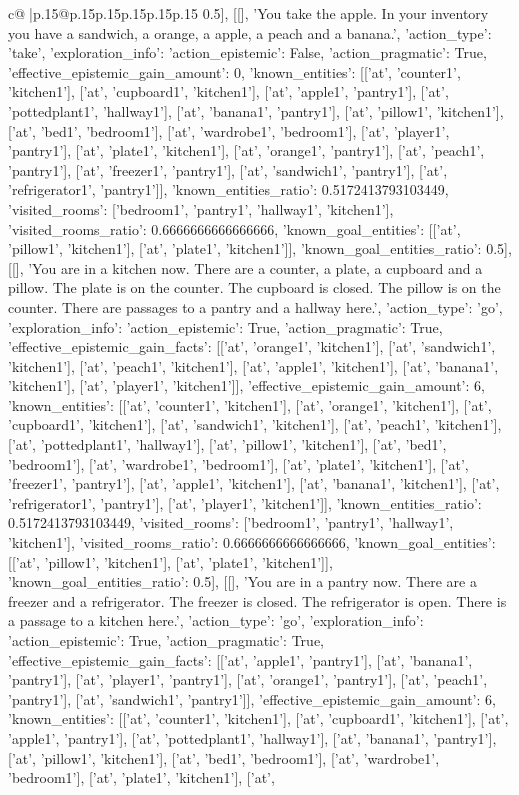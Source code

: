 \documentclass{article}
\begin{document}
{\begin{supertabular}{c@{$\;$}|p{.15\linewidth}@{}p{.15\linewidth}p{.15\linewidth}p{.15\linewidth}p{.15\linewidth}p{.15\linewidth}}
{{{0.5}}], [[], 'You take the apple. In your inventory you have a sandwich, a orange, a apple, a peach and a banana.\n', {'action_type': 'take', 'exploration_info': {'action_epistemic': False, 'action_pragmatic': True, 'effective_epistemic_gain_amount': 0, 'known_entities': [['at', 'counter1', 'kitchen1'], ['at', 'cupboard1', 'kitchen1'], ['at', 'apple1', 'pantry1'], ['at', 'pottedplant1', 'hallway1'], ['at', 'banana1', 'pantry1'], ['at', 'pillow1', 'kitchen1'], ['at', 'bed1', 'bedroom1'], ['at', 'wardrobe1', 'bedroom1'], ['at', 'player1', 'pantry1'], ['at', 'plate1', 'kitchen1'], ['at', 'orange1', 'pantry1'], ['at', 'peach1', 'pantry1'], ['at', 'freezer1', 'pantry1'], ['at', 'sandwich1', 'pantry1'], ['at', 'refrigerator1', 'pantry1']], 'known_entities_ratio': 0.5172413793103449, 'visited_rooms': ['bedroom1', 'pantry1', 'hallway1', 'kitchen1'], 'visited_rooms_ratio': 0.6666666666666666, 'known_goal_entities': [['at', 'pillow1', 'kitchen1'], ['at', 'plate1', 'kitchen1']], 'known_goal_entities_ratio': 0.5}}], [[], 'You are in a kitchen now. There are a counter, a plate, a cupboard and a pillow. The plate is on the counter. The cupboard is closed. The pillow is on the counter. There are passages to a pantry and a hallway here.\n', {'action_type': 'go', 'exploration_info': {'action_epistemic': True, 'action_pragmatic': True, 'effective_epistemic_gain_facts': [['at', 'orange1', 'kitchen1'], ['at', 'sandwich1', 'kitchen1'], ['at', 'peach1', 'kitchen1'], ['at', 'apple1', 'kitchen1'], ['at', 'banana1', 'kitchen1'], ['at', 'player1', 'kitchen1']], 'effective_epistemic_gain_amount': 6, 'known_entities': [['at', 'counter1', 'kitchen1'], ['at', 'orange1', 'kitchen1'], ['at', 'cupboard1', 'kitchen1'], ['at', 'sandwich1', 'kitchen1'], ['at', 'peach1', 'kitchen1'], ['at', 'pottedplant1', 'hallway1'], ['at', 'pillow1', 'kitchen1'], ['at', 'bed1', 'bedroom1'], ['at', 'wardrobe1', 'bedroom1'], ['at', 'plate1', 'kitchen1'], ['at', 'freezer1', 'pantry1'], ['at', 'apple1', 'kitchen1'], ['at', 'banana1', 'kitchen1'], ['at', 'refrigerator1', 'pantry1'], ['at', 'player1', 'kitchen1']], 'known_entities_ratio': 0.5172413793103449, 'visited_rooms': ['bedroom1', 'pantry1', 'hallway1', 'kitchen1'], 'visited_rooms_ratio': 0.6666666666666666, 'known_goal_entities': [['at', 'pillow1', 'kitchen1'], ['at', 'plate1', 'kitchen1']], 'known_goal_entities_ratio': 0.5}}], [[], 'You are in a pantry now. There are a freezer and a refrigerator. The freezer is closed. The refrigerator is open. There is a passage to a kitchen here.\n', {'action_type': 'go', 'exploration_info': {'action_epistemic': True, 'action_pragmatic': True, 'effective_epistemic_gain_facts': [['at', 'apple1', 'pantry1'], ['at', 'banana1', 'pantry1'], ['at', 'player1', 'pantry1'], ['at', 'orange1', 'pantry1'], ['at', 'peach1', 'pantry1'], ['at', 'sandwich1', 'pantry1']], 'effective_epistemic_gain_amount': 6, 'known_entities': [['at', 'counter1', 'kitchen1'], ['at', 'cupboard1', 'kitchen1'], ['at', 'apple1', 'pantry1'], ['at', 'pottedplant1', 'hallway1'], ['at', 'banana1', 'pantry1'], ['at', 'pillow1', 'kitchen1'], ['at', 'bed1', 'bedroom1'], ['at', 'wardrobe1', 'bedroom1'], ['at', 'plate1', 'kitchen1'], ['at', }}}
\end{supertabular}}
\end{document}

